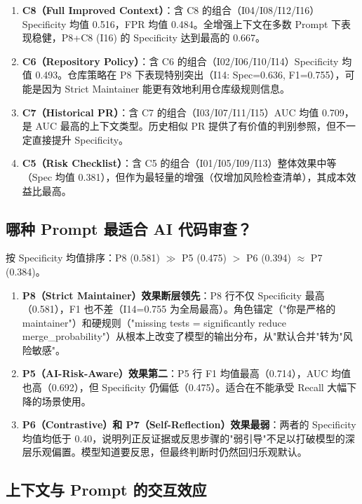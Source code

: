 \documentclass{experimentreport}
\begin{document}
\begin{enumerate}
    \item \textbf{C8（Full Improved Context）}：含 C8 的组合（I04/I08/I12/I16）Specificity 均值 0.516，FPR 均值 0.484。全增强上下文在多数 Prompt 下表现稳健，P8+C8 (I16) 的 Specificity 达到最高的 0.667。
    \item \textbf{C6（Repository Policy）}：含 C6 的组合（I02/I06/I10/I14）Specificity 均值 0.493。仓库策略在 P8 下表现特别突出（I14: Spec=0.636, F1=0.755），可能是因为 Strict Maintainer 能更有效地利用仓库级规则信息。
    \item \textbf{C7（Historical PR）}：含 C7 的组合（I03/I07/I11/I15）AUC 均值 0.709，是 AUC 最高的上下文类型。历史相似 PR 提供了有价值的判别参照，但不一定直接提升 Specificity。
    \item \textbf{C5（Risk Checklist）}：含 C5 的组合（I01/I05/I09/I13）整体效果中等（Spec 均值 0.381），但作为最轻量的增强（仅增加风险检查清单），其成本效益比最高。
\end{enumerate}

\subsection{哪种 Prompt 最适合 AI 代码审查？}

按 Specificity 均值排序：P8 (0.581) $\gg$ P5 (0.475) $>$ P6 (0.394) $\approx$ P7 (0.384)。

\begin{enumerate}
    \item \textbf{P8（Strict Maintainer）效果断层领先}：P8 行不仅 Specificity 最高（0.581），F1 也不差（I14=0.755 为全局最高）。角色锚定（"你是严格的 maintainer"）和硬规则（"missing tests = significantly reduce merge\_probability"）从根本上改变了模型的输出分布，从"默认合并"转为"风险敏感"。
    \item \textbf{P5（AI-Risk-Aware）效果第二}：P5 行 F1 均值最高（0.714），AUC 均值也高（0.692），但 Specificity 仍偏低（0.475）。适合在不能承受 Recall 大幅下降的场景使用。
    \item \textbf{P6（Contrastive）和 P7（Self-Reflection）效果最弱}：两者的 Specificity 均值均低于 0.40，说明列正反证据或反思步骤的"弱引导"不足以打破模型的深层乐观偏置。模型知道要反思，但最终判断时仍然回归乐观默认。
\end{enumerate}

\subsection{上下文与 Prompt 的交互效应}
\end{document}
